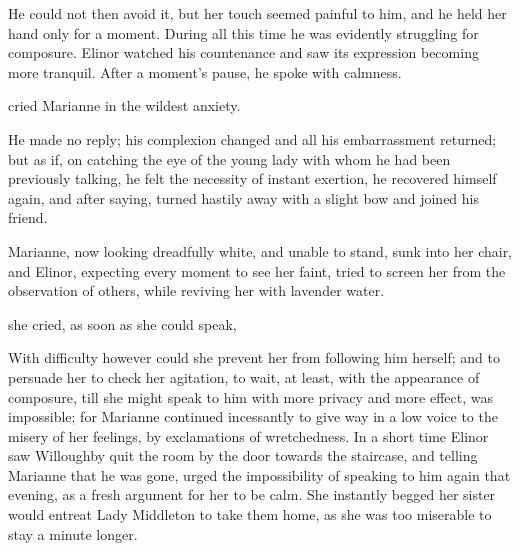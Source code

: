 He could not then avoid it, but her touch seemed painful to him, and he held her hand only for a moment. During all this time he was evidently struggling for composure. Elinor watched his countenance and saw its expression becoming more tranquil. After a moment's pause, he spoke with calmness.


 cried Marianne in the wildest anxiety. 

He made no reply; his complexion changed and all his embarrassment returned; but as if, on catching the eye of the young lady with whom he had been previously talking, he felt the necessity of instant exertion, he recovered himself again, and after saying,  turned hastily away with a slight bow and joined his friend.

Marianne, now looking dreadfully white, and unable to stand, sunk into her chair, and Elinor, expecting every moment to see her faint, tried to screen her from the observation of others, while reviving her with lavender water.

 she cried, as soon as she could speak, 


With difficulty however could she prevent her from following him herself; and to persuade her to check her agitation, to wait, at least, with the appearance of composure, till she might speak to him with more privacy and more effect, was impossible; for Marianne continued incessantly to give way in a low voice to the misery of her feelings, by exclamations of wretchedness. In a short time Elinor saw Willoughby quit the room by the door towards the staircase, and telling Marianne that he was gone, urged the impossibility of speaking to him again that evening, as a fresh argument for her to be calm. She instantly begged her sister would entreat Lady Middleton to take them home, as she was too miserable to stay a minute longer.

